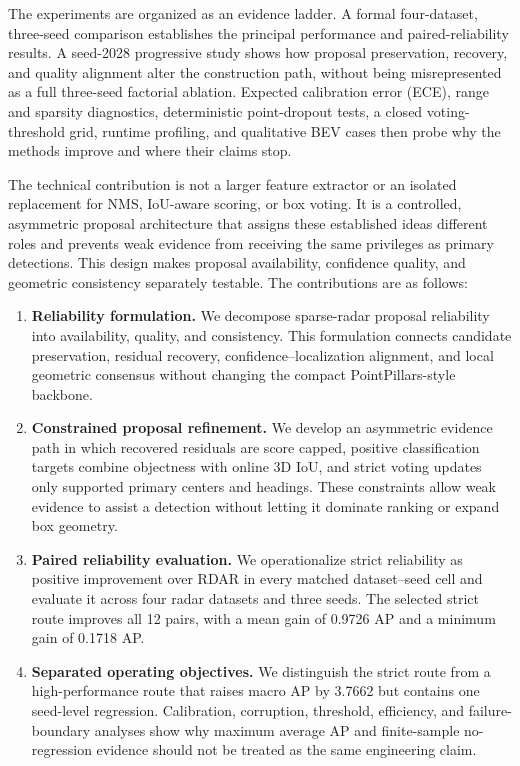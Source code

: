 \documentclass[preprint,12pt,times]{elsarticle}
\begin{document}
The experiments are organized as an evidence ladder. A formal
four-dataset, three-seed comparison establishes the principal performance and
paired-reliability results. A seed-2028 progressive study shows how proposal
preservation, recovery, and quality alignment alter the construction path,
without being misrepresented as a full three-seed factorial ablation. Expected
calibration error (ECE), range and sparsity diagnostics, deterministic
point-dropout tests, a closed voting-threshold grid, runtime profiling, and
qualitative BEV cases then probe why the methods improve and where their claims
stop.

The technical contribution is not a larger feature extractor or an isolated
replacement for NMS, IoU-aware scoring, or box voting. It is a controlled,
asymmetric proposal architecture that assigns these established ideas
different roles and prevents weak evidence from receiving the same privileges
as primary detections. This design makes proposal availability, confidence
quality, and geometric consistency separately testable. The contributions are
as follows:
\begin{enumerate}[leftmargin=*]
\item \textbf{Reliability formulation.} We decompose sparse-radar proposal
reliability into availability, quality, and consistency. This formulation
connects candidate preservation, residual recovery, confidence--localization
alignment, and local geometric consensus without changing the compact
PointPillars-style backbone.
\item \textbf{Constrained proposal refinement.} We develop an asymmetric
evidence path in which recovered residuals are score capped, positive
classification targets combine objectness with online 3D IoU, and strict
voting updates only supported primary centers and headings. These constraints
allow weak evidence to assist a detection without letting it dominate ranking
or expand box geometry.
\item \textbf{Paired reliability evaluation.} We operationalize strict
reliability as positive improvement over RDAR in every matched dataset--seed
cell and evaluate it across four radar datasets and three seeds. The selected
strict route improves all 12 pairs, with a mean gain of 0.9726 AP and a minimum
gain of 0.1718 AP.
\item \textbf{Separated operating objectives.} We distinguish the strict route
from a high-performance route that raises macro AP by 3.7662 but contains one
seed-level regression. Calibration, corruption, threshold, efficiency, and
failure-boundary analyses show why maximum average AP and finite-sample
no-regression evidence should not be treated as the same engineering claim.
\end{enumerate}
\end{document}

